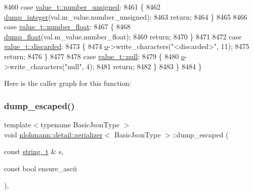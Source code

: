 \begin{DoxyCode}
8460             \textcolor{keywordflow}{case} \hyperlink{namespacenlohmann_1_1detail_a1ed8fc6239da25abcaf681d30ace4985adce7cc8ec29055c4158828921f2f265e}{value\_t::number\_unsigned}:
8461             \{
8462                 \hyperlink{classnlohmann_1_1detail_1_1serializer_a944f6dea8dbe2961da145d2f62fa2c2f}{dump\_integer}(val.m\_value.number\_unsigned);
8463                 \textcolor{keywordflow}{return};
8464             \}
8465 
8466             \textcolor{keywordflow}{case} \hyperlink{namespacenlohmann_1_1detail_a1ed8fc6239da25abcaf681d30ace4985ad9966ecb59667235a57b4b999a649eef}{value\_t::number\_float}:
8467             \{
8468                 \hyperlink{classnlohmann_1_1detail_1_1serializer_a6d652a3bfa581cf1cd7790d6d11ea52f}{dump\_float}(val.m\_value.number\_float);
8469                 \textcolor{keywordflow}{return};
8470             \}
8471 
8472             \textcolor{keywordflow}{case} \hyperlink{namespacenlohmann_1_1detail_a1ed8fc6239da25abcaf681d30ace4985a94708897ec9db8647dfe695714c98e46}{value\_t::discarded}:
8473             \{
8474                 \hyperlink{classnlohmann_1_1detail_1_1serializer_acf3c88660d3cbc65fc71c4d84f2a9f59}{o}->write\_characters(\textcolor{stringliteral}{"<discarded>"}, 11);
8475                 \textcolor{keywordflow}{return};
8476             \}
8477 
8478             \textcolor{keywordflow}{case} \hyperlink{namespacenlohmann_1_1detail_a1ed8fc6239da25abcaf681d30ace4985a37a6259cc0c1dae299a7866489dff0bd}{value\_t::null}:
8479             \{
8480                 \hyperlink{classnlohmann_1_1detail_1_1serializer_acf3c88660d3cbc65fc71c4d84f2a9f59}{o}->write\_characters(\textcolor{stringliteral}{"null"}, 4);
8481                 \textcolor{keywordflow}{return};
8482             \}
8483         \}
8484     \}
\end{DoxyCode}
Here is the caller graph for this function\+:
\mbox{\label{classnlohmann_1_1detail_1_1serializer_ac1f8d1165b44149bd8be397dce68ea05}} 
\subsubsection{\texorpdfstring{dump\+\_\+escaped()}{dump\_escaped()}}
{\footnotesize\ttfamily template$<$typename Basic\+Json\+Type $>$ \\
void \hyperlink{classnlohmann_1_1detail_1_1serializer}{nlohmann\+::detail\+::serializer}$<$ Basic\+Json\+Type $>$\+::dump\+\_\+escaped (\begin{DoxyParamCaption}\item[{const \hyperlink{classnlohmann_1_1detail_1_1serializer_ad08aa54fac1dd0a453320c54137d45ba}{string\+\_\+t} \&}]{s,  }\item[{const bool}]{ensure\+\_\+ascii }\end{DoxyParamCaption})\hspace{0.3cm}{\ttfamily [inline]}, {\ttfamily [private]}}



